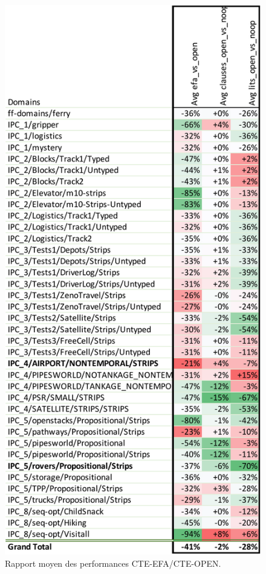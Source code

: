 \begin{figure}[ht!] \centering
\begin{center} \includegraphics[width=.75\textwidth]{tableaux/experiment-efa_vs_open-crop.pdf} \end{center}
\caption{Rapport moyen des performances CTE-EFA/CTE-OPEN.}
\label{fig:tab-exp-efa-vs-open}
\end{figure}





